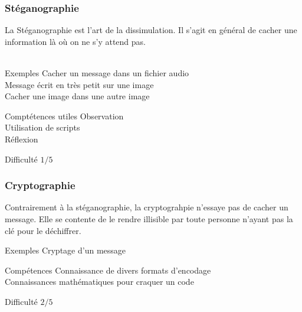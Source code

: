 \documentclass{beamer}
\begin{document}

\begin{frame}
\frametitle{Stéganographie}

La Stéganographie est l’art de la dissimulation. Il s’agit en général de cacher une information là où on ne s’y attend pas. \\~\\

\begin{block}{Exemples}
    Cacher un message dans un fichier audio \\
    Message écrit en très petit sur une image \\
    Cacher une image dans une autre image
\end{block}

\begin{block}{Comptétences utiles}
    Observation \\
    Utilisation de scripts \\
    Réflexion
\end{block}

\begin{block}{Difficulté}
    $1/5$
\end{block}

\end{frame}


\begin{frame}
\frametitle{Cryptographie}

Contrairement à la stéganographie, la cryptograhpie n'essaye pas de cacher un message. Elle se contente de le rendre illisible par toute personne n'ayant pas la clé pour le déchiffrer.

\begin{block}{Exemples}
    Cryptage d'un message 
\end{block}

\begin{block}{Compétences}
    Connaissance de divers formats d'encodage \\
    Connaissances mathématiques pour craquer un code
\end{block}

\begin{block}{Difficulté}
    $2/5$
\end{block}

\end{frame}
\end{document}
